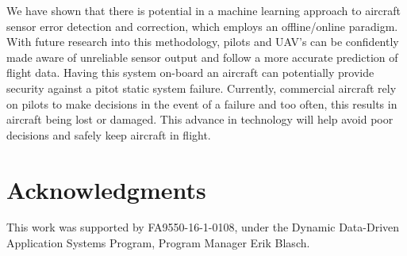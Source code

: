 \documentclass[]{aiaa-tc}
\begin{document}
We have shown that there is potential in a machine learning approach to aircraft sensor error detection and correction, which employs an offline/online paradigm. With future research into this methodology, pilots and UAV's can be confidently made aware of unreliable sensor output and follow a more accurate prediction of flight data. Having this system on-board an aircraft can potentially provide security against a pitot static system failure. Currently, commercial aircraft rely on pilots to make decisions in the event of a failure and too often, this results in aircraft being lost or damaged. This advance in technology will help avoid poor decisions and safely keep aircraft in flight. 


\section*{Acknowledgments}

This work was supported by FA9550-16-1-0108, under the Dynamic Data-Driven Application Systems Program, Program Manager Erik Blasch.
\newpage





\end{document}

